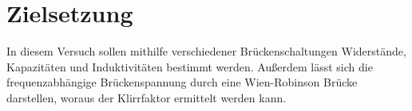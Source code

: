 \section{Zielsetzung}

In diesem Versuch sollen mithilfe verschiedener Brückenschaltungen Widerstände, Kapazitäten und Induktivitäten bestimmt werden.
Außerdem lässt sich die frequenzabhängige Brückenspannung durch eine Wien-Robinson Brücke darstellen, woraus der Klirrfaktor ermittelt werden kann.
